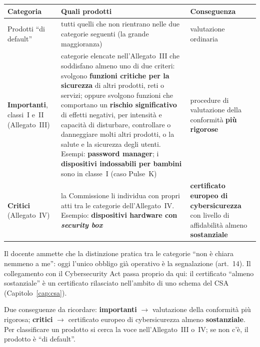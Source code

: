 \begin{center}
\small
\begin{tabularx}{\linewidth}{>{\raggedright\arraybackslash}p{2.6cm} X X}
\toprule
\textbf{Categoria} & \textbf{Quali prodotti} & \textbf{Conseguenza}\\
\midrule
Prodotti ``di default'' & tutti quelli che non rientrano nelle due categorie seguenti (la grande
  maggioranza) & valutazione ordinaria\\
\midrule
\textbf{Importanti}, classi~I e~II (Allegato~III) & categorie elencate nell'Allegato~III che soddisfano
  almeno uno di due criteri: svolgono \textbf{funzioni critiche per la sicurezza} di altri prodotti, reti o
  servizi; oppure svolgono funzioni che comportano un \textbf{rischio significativo} di effetti negativi,
  per intensità e capacità di disturbare, controllare o danneggiare molti altri prodotti, o la salute e
  la sicurezza degli utenti. Esempi: \textbf{password manager}; i \textbf{dispositivi indossabili per
  bambini} sono in classe~I (caso Pulse~K) & procedure di valutazione della conformità \textbf{più
  rigorose}\\
\midrule
\textbf{Critici} (Allegato~IV) & la Commissione li individua con propri atti tra le categorie
  dell'Allegato~IV. Esempio: \textbf{dispositivi hardware con \emph{security box}} &
  \textbf{certificato europeo di cybersicurezza} con livello di affidabilità almeno
  \textbf{sostanziale}\\
\bottomrule
\end{tabularx}
\end{center}

Il docente ammette che la distinzione pratica tra le categorie ``non è chiara nemmeno a me'': oggi
l'unico obbligo già operativo è la segnalazione (art.~14). Il collegamento con il Cybersecurity Act passa
proprio da qui: il certificato ``almeno sostanziale'' è un certificato rilasciato nell'ambito di uno schema
del CSA (Capitolo~\ref{cap:csa}).

\begin{esame}
Due conseguenze da ricordare: \textbf{importanti} $\rightarrow$ valutazione della conformità più
rigorosa; \textbf{critici} $\rightarrow$ certificato europeo di cybersicurezza almeno
\textbf{sostanziale}. Per classificare un prodotto si cerca la voce nell'Allegato~III o~IV; se non c'è, il
prodotto è ``di default''.
\end{esame}

